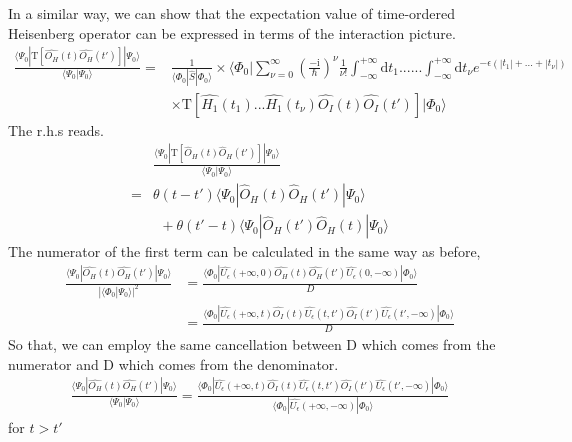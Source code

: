 In a similar way, we can show that  the expectation value of time-ordered Heisenberg operator can be expressed in terms of the interaction picture.
\begin{align}\label{2.4.3}
\frac{\langle\Psi_0|\mathrm{T}[\hat{O_H}(t)\hat{O_H}(t')]|\Psi_0\rangle}{\langle\Psi_0|\Psi_0\rangle}=&\frac{1}{\langle\Phi_0|\hat{S}|\Phi_0\rangle}\times\langle\Phi_0|\sum_{\nu=0}^{\infty}(\frac{-\mathrm{i}}{\hbar})^{\nu} \frac{1}{\nu!} \int_{-\infty}^{+\infty}\mathrm{d}t_1......\int_{-\infty}^{+\infty}\mathrm{d}t_{\nu}e^{-\epsilon(|t_1|+...+|t_{\nu}|)} \nonumber\\
&\times \mathrm{T}[\hat{H_1}(t_1)...\hat{H_1}(t_{\nu})\hat{O_I}(t)\hat{O_I}(t')]|\Phi_0\rangle
\end{align}
The r.h.s reads.
\begin{align}
&\frac{\langle\Psi_0|\mathrm{T}[\hat O_{H}(t)\hat O_H (t')]|\Psi_0\rangle}{\langle\Psi_0|\Psi_0\rangle} \nonumber \\
=&\theta(t-t')\langle\Psi_0|\hat O_{H}(t)\hat O_H (t')|\Psi_0\rangle \nonumber \\
& \ \ +\theta(t'-t)\langle\Psi_0|\hat O_{H}(t')\hat O_H (t)|\Psi_0\rangle \nonumber 
\end{align}
The numerator of the first term can be calculated in the same way as before,
\begin{align}
\frac{\langle\Psi_0|\hat{O_H}(t)\hat{O_H}(t')|\Psi_0\rangle}{|\langle\Phi_0|\Psi_0\rangle|^2}&=\frac{\langle\Phi_0|\hat{U_{\epsilon}}(+\infty,0)\hat{O_H}(t)\hat{O_H}(t')\hat{U_{\epsilon}}(0,-\infty)|\Phi_0\rangle}{D} \nonumber \\
&=\frac{\langle\Phi_0|\hat{U_{\epsilon}}(+\infty,t)\hat{O_I}(t)\hat{U_{\epsilon}}(t,t')\hat{O_I}(t')\hat{U_{\epsilon}}(t',-\infty)|\Phi_0\rangle}{D} \nonumber
\end{align}
So that, we can employ the same cancellation between D which comes from the numerator and D which comes from the denominator.
\begin{align}
\frac{\langle\Psi_0|\hat{O_H}(t)\hat{O_H}(t')|\Psi_0\rangle}{\langle\Psi_0|\Psi_0\rangle}=\frac{\langle\Phi_0|\hat{U_{\epsilon}}(+\infty,t)\hat{O_I}(t)\hat{U_{\epsilon}}(t,t')\hat{O_I}(t')\hat{U_{\epsilon}}(t',-\infty)|\Phi_0\rangle}{\langle\Phi_0|\hat{U_{\epsilon}}(+\infty,-\infty)|\Phi_0\rangle}\nonumber
\end{align}
for $t>t'$

